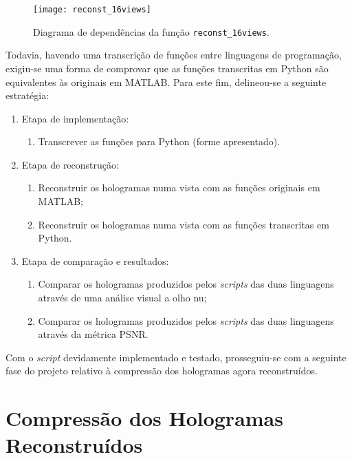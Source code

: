 \begin{figure}[!htbp]
    \centering
    \texttt{[image: reconst\_16views]}
    \caption{Diagrama de dependências da função \texttt{reconst\_16views}.}
    \label{fig:reconst_16views}
\end{figure}

Todavia, havendo uma transcrição de funções entre linguagens de programação, exigiu-se uma forma de comprovar que as funções transcritas em Python são equivalentes às originais em MATLAB. Para este fim, delineou-se a seguinte estratégia:

\begin{enumerate}
    \item Etapa de implementação:
    \begin{enumerate}
        \item Transcrever as funções para Python (forme apresentado).
    \end{enumerate}
    
    \item Etapa de reconstrução:
    \begin{enumerate}
        \item Reconstruir os hologramas numa vista com as funções originais em MATLAB;
        \item Reconstruir os hologramas numa vista com as funções transcritas em Python.
    \end{enumerate}

    \item Etapa de comparação e resultados:
    \begin{enumerate}
        \item Comparar os hologramas produzidos pelos \textit{scripts} das duas linguagens através de uma análise visual a olho nu;
        \item Comparar os hologramas produzidos pelos \textit{scripts} das duas linguagens através da métrica \ac{PSNR}.
    \end{enumerate}
\end{enumerate}

Com o \textit{script} devidamente implementado e testado, prosseguiu-se com a seguinte fase do projeto relativo à compressão dos hologramas agora reconstruídos.


\section{Compressão dos Hologramas Reconstruídos}
\label{sec::imp-test:holo-compress}

